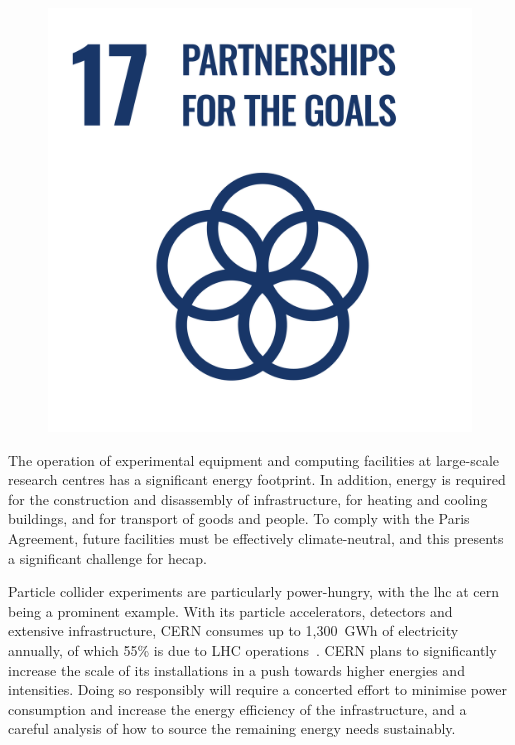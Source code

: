 \documentclass[../SustainableHEP.tex]{subfiles}
\begin{document}
\begin{figure}
\includegraphics[width=\SDGsize]{Sections/Figs/Common/SDG_17_PartnershipForGoals.png}

\end{figure}


\noindent
The operation of experimental equipment and computing facilities at large-scale research centres has a significant energy footprint. 
In addition, energy is required for the construction and disassembly of infrastructure, for heating and cooling buildings, and for transport of goods and people. To comply with the Paris Agreement, future facilities must be effectively climate-neutral, and this presents a significant challenge for \acrshort{hecap}.

Particle collider experiments are particularly power-hungry, with the \acrshort{lhc} at \acrshort{cern} being a prominent example. With its particle accelerators, detectors and extensive infrastructure, CERN consumes up to 1,300~GWh of electricity annually, of which 55\% is due to LHC operations~\cite{Environment:2737239,CERNenergymanagement}. CERN plans to significantly increase the scale of its installations in a push towards higher energies and intensities. Doing so responsibly will require a concerted effort to minimise power consumption and increase the energy efficiency of the infrastructure, and a careful analysis of how to source the remaining energy needs sustainably.
\end{document}

